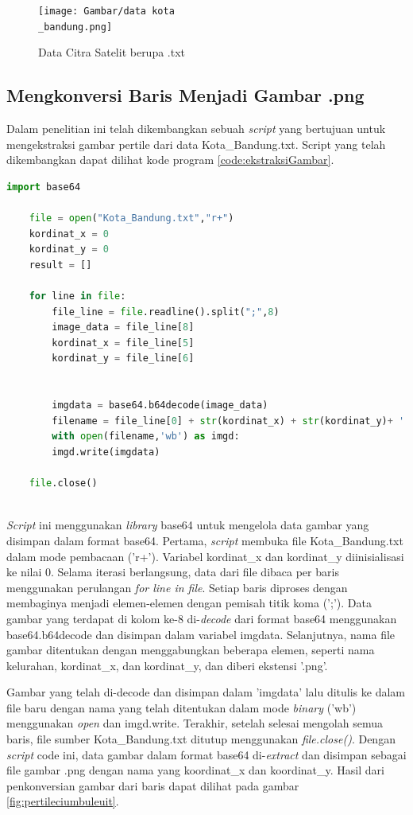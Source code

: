 \begin{figure}[H]
	\centering
	\texttt{[image: Gambar/data kota\\\_bandung.png]}
	\caption{Data Citra Satelit berupa .txt}
	\label{fig:kotabandungteks}
\end{figure} 

\subsection{Mengkonversi Baris Menjadi Gambar .png}
\label{subsec:pengkorvesianBaris}
Dalam penelitian ini telah dikembangkan sebuah \textit{script} yang bertujuan untuk mengekstraksi gambar pertile dari data Kota\_Bandung.txt. Script yang telah dikembangkan dapat dilihat kode program \ref{code:ekstraksiGambar}.

\begin{lstlisting}[language=Python, caption=Script Mengekstrasi gambar per tile,label={code:ekstraksiGambar}]
	import base64
	
	file = open("Kota_Bandung.txt","r+")
	kordinat_x = 0
	kordinat_y = 0
	result = []
	
	for line in file:
		file_line = file.readline().split(";",8)   
		image_data = file_line[8]
		kordinat_x = file_line[5]
		kordinat_y = file_line[6]
		
		
		imgdata = base64.b64decode(image_data)
		filename = file_line[0] + str(kordinat_x) + str(kordinat_y)+ '.png'
		with open(filename,'wb') as imgd:
		imgd.write(imgdata)
	
	file.close()
		
\end{lstlisting}

\textit{Script }ini menggunakan \textit{library} base64 untuk mengelola data gambar yang disimpan dalam format base64. Pertama, \textit{script} membuka file Kota\_Bandung.txt dalam mode pembacaan ('r+'). Variabel kordinat\_x dan kordinat\_y diinisialisasi ke nilai 0. Selama iterasi berlangsung, data dari file dibaca per baris menggunakan perulangan \textit{for line in file}. Setiap baris diproses dengan membaginya menjadi elemen-elemen dengan pemisah titik koma (';'). Data gambar yang terdapat di kolom ke-8 di-\textit{decode} dari format base64 menggunakan base64.b64decode dan disimpan dalam variabel imgdata. Selanjutnya, nama file gambar ditentukan dengan menggabungkan beberapa elemen, seperti nama kelurahan, kordinat\_x, dan kordinat\_y, dan diberi ekstensi '.png'.

Gambar yang telah di-decode dan disimpan dalam 'imgdata' lalu ditulis ke dalam file baru dengan nama yang telah ditentukan dalam mode \textit{binary} ('wb') menggunakan \textit{open} dan imgd.write. Terakhir, setelah selesai mengolah semua baris, file sumber Kota\_Bandung.txt ditutup menggunakan \textit{file.close()}. Dengan \textit{script} code ini, data gambar dalam format base64 di-\textit{extract} dan disimpan sebagai file gambar .png dengan nama yang koordinat\_x dan koordinat\_y. Hasil dari penkonversian gambar dari baris dapat dilihat pada gambar \ref{fig:pertileciumbuleuit}.

